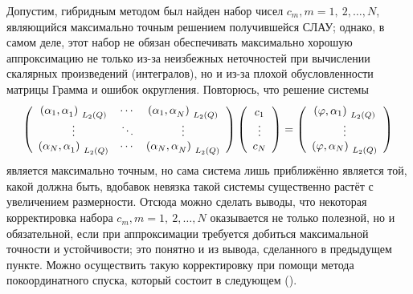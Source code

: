 ﻿\documentclass[a4paper, 12pt]{article}
\begin{document}
Допустим, гибридным методом был найден набор чисел $c_m,m=1,\ 2,\dots ,N$, являющийся максимально точным решением получившейся СЛАУ; однако, в самом деле, этот набор не обязан обеспечивать максимально хорошую аппроксимацию не только из-за неизбежных неточностей при вычислении скалярных произведений (интегралов), но и из-за плохой обусловленности матрицы Грамма и ошибок округления. Повторюсь, что решение системы
\begin{equation}\left( \begin{array}{ccc}
{{({\alpha }_1,\alpha }_1)}_{{\ L}_2\left(Q\right)} & \cdots  & {{({\alpha }_1,\alpha }_N)}_{{\ L}_2\left(Q\right)} \\ 
\vdots  & \ddots  & \vdots  \\ 
{{({\alpha }_N,\alpha }_1)}_{{\ L}_2\left(Q\right)} & \cdots  & {{({\alpha }_N,\alpha }_N)}_{{\ L}_2\left(Q\right)} \end{array}
\right)\left( \begin{array}{c}
c_1 \\ 
\vdots  \\ 
c_N \end{array}
\right)=\left( \begin{array}{c}
{\left(\varphi ,{\alpha }_1\right)}_{{\ L}_2\left(Q\right)} \\ 
\vdots  \\ 
{\left(\varphi ,{\alpha }_N\right)}_{{\ L}_2\left(Q\right)} \end{array}
\right)\\\end{equation} 
является максимально точным, но сама система лишь приближённо является той, какой должна быть, вдобавок невязка такой системы существенно растёт с увеличением размерности. Отсюда можно сделать выводы, что некоторая корректировка набора $c_m,m=1,\ 2,\dots ,N$ оказывается не только полезной, но и обязательной, если при аппроксимации требуется добиться максимальной точности и устойчивости; это понятно и из вывода, сделанного в предыдущем пункте. Можно осуществить такую корректировку при помощи метода покоординатного спуска, который состоит в следующем (\cite{12sch,15lob}).
\end{document}
